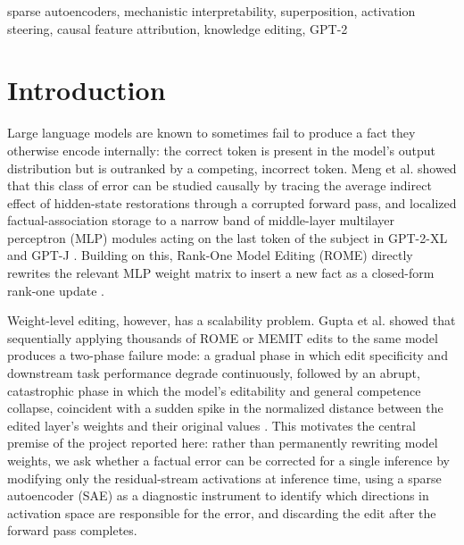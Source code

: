 \documentclass[conference]{IEEEtran}
\begin{document}
\begin{IEEEkeywords}
sparse autoencoders, mechanistic interpretability, superposition, activation steering, causal feature attribution, knowledge editing, GPT-2
\end{IEEEkeywords}

\section{Introduction}

Large language models are known to sometimes fail to produce a fact they otherwise encode internally: the correct token is present in the model's output distribution but is outranked by a competing, incorrect token. Meng et al. showed that this class of error can be studied causally by tracing the average indirect effect of hidden-state restorations through a corrupted forward pass, and localized factual-association storage to a narrow band of middle-layer multilayer perceptron (MLP) modules acting on the last token of the subject in GPT-2-XL and GPT-J \cite{meng2022rome}. Building on this, Rank-One Model Editing (ROME) directly rewrites the relevant MLP weight matrix to insert a new fact as a closed-form rank-one update \cite{meng2022rome}.

Weight-level editing, however, has a scalability problem. Gupta et al. showed that sequentially applying thousands of ROME or MEMIT edits to the same model produces a two-phase failure mode: a gradual phase in which edit specificity and downstream task performance degrade continuously, followed by an abrupt, catastrophic phase in which the model's editability and general competence collapse, coincident with a sudden spike in the normalized distance between the edited layer's weights and their original values \cite{gupta2024forgetting}. This motivates the central premise of the project reported here: rather than permanently rewriting model weights, we ask whether a factual error can be corrected for a single inference by modifying only the residual-stream activations at inference time, using a sparse autoencoder (SAE) as a diagnostic instrument to identify which directions in activation space are responsible for the error, and discarding the edit after the forward pass completes.
\end{document}
